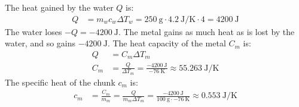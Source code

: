 \documentclass{article}
\begin{document}
\clearpage

The heat gained by the water $Q$ is:
\begin{equation}
    \begin{split}
        Q & = m_wc_w\Delta T_w = 250~\unit{\gram}\cdot 4.2~\unit{\joule\per\kelvin}\cdot 4 = 4200~\unit{\joule}
    \end{split}
\end{equation}
The water loses $-Q = -4200~\unit{\joule}$.
The metal gains as much heat as is lost by the water, and so gains $-4200~\unit{\joule}$.
The heat capacity of the metal $C_m$ is:
\begin{equation}
    \begin{split}
        Q & = C_m\Delta T_m \\
        C_m & = \frac{Q}{\Delta T_m} = \frac{-4200~\unit{\joule}}{-76~\unit{\kelvin}} \approx 55.263~\unit{\joule\per\kelvin}
    \end{split}
\end{equation}
The specific heat of the chunk $c_m$ is:
\begin{equation}
    \begin{split}
        c_m & = \frac{C_m}{m_m} = \frac{Q}{m_m\Delta T_m} = \frac{-4200~\unit{\joule}}{100~\unit{\gram}\cdot -76~\unit{\kelvin}} \approx 0.553~\unit{\joule\per\kelvin}
    \end{split}
\end{equation}

\clearpage
\end{document}
